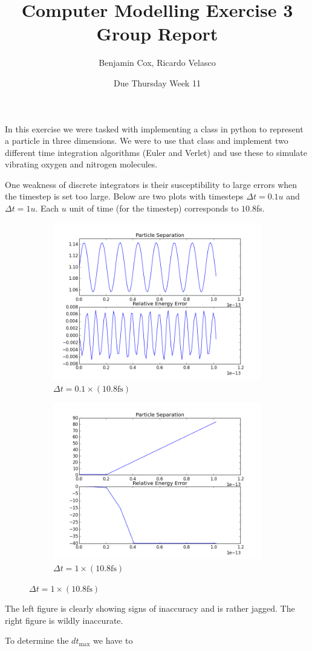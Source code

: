\documentclass[12pt]{article}
\author{Benjamin Cox, Ricardo Velasco}
\title{Computer Modelling Exercise 3 Group Report}
\date{Due Thursday Week 11}
\begin{document}
	{\let\newpage\relax\maketitle}
	
	In this exercise we were tasked with implementing a class in python to represent a particle in three dimensions. We were to use that class and implement two different time integration algorithms (Euler and Verlet) and use these to simulate vibrating oxygen and nitrogen molecules. 
	
	One weakness of discrete integrators is their susceptibility to large errors when the timestep is set too large. Below are two plots with timesteps $\Delta t = 0.1u$ and $\Delta t = 1u$. Each $u$ unit of time (for the timestep) corresponds to $10.8$fs.
	
	\begin{figure}[H]
		\centering
		\begin{subfigure}{0.45\textwidth}
			\includegraphics[width=\textwidth]{largedt}
			\caption*{$\Delta t = 0.1\times(10.8\text{fs})$}
		\end{subfigure}
		\begin{subfigure}{0.45\textwidth}
			\includegraphics[width=\textwidth]{largerdt}
			\caption*{$\Delta t = 1\times(10.8\text{fs})$}
		\end{subfigure}
	\end{figure}
	
	The left figure is clearly showing signs of inaccuracy and is rather jagged. The right figure is wildly inaccurate.
	
	To determine the $dt_{\text{max}}$ we have to 
\end{document}
